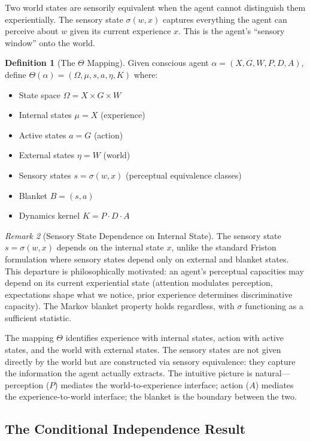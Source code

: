 \documentclass[11pt,a4paper]{article}
\theoremstyle{definition}
\newtheorem{definition}{Definition}[section]
\theoremstyle{plain}
\theoremstyle{remark}
\newtheorem{remark}[definition]{Remark}
\begin{document}
Two world states are sensorily equivalent when the agent cannot distinguish them experientially. The sensory state $\sigma(w, x)$ captures everything the agent can perceive about $w$ given its current experience $x$. This is the agent's ``sensory window'' onto the world.

\begin{definition}[The $\Theta$ Mapping]\label{def:theta}
Given conscious agent $\alpha = (X, G, W, P, D, A)$, define $\Theta(\alpha) = (\Omega, \mu, s, a, \eta, K)$ where:
\begin{itemize}
    \item State space $\Omega = X \times G \times W$
    \item Internal states $\mu = X$ (experience)
    \item Active states $a = G$ (action)
    \item External states $\eta = W$ (world)
    \item Sensory states $s = \sigma(w, x)$ (perceptual equivalence classes)
    \item Blanket $B = (s, a)$
    \item Dynamics kernel $K = P \cdot D \cdot A$
\end{itemize}
\end{definition}

\begin{remark}[Sensory State Dependence on Internal State]
The sensory state $s = \sigma(w, x)$ depends on the internal state $x$, unlike the standard Friston formulation where sensory states depend only on external and blanket states. This departure is philosophically motivated: an agent's perceptual capacities may depend on its current experiential state (attention modulates perception, expectations shape what we notice, prior experience determines discriminative capacity). The Markov blanket property holds regardless, with $\sigma$ functioning as a sufficient statistic.
\end{remark}

The mapping $\Theta$ identifies experience with internal states, action with active states, and the world with external states. The sensory states are not given directly by the world but are constructed via sensory equivalence: they capture the information the agent actually extracts. The intuitive picture is natural---perception ($P$) mediates the world-to-experience interface; action ($A$) mediates the experience-to-world interface; the blanket is the boundary between the two.

\subsection{The Conditional Independence Result}\label{sec:cond-ind}
\end{document}
